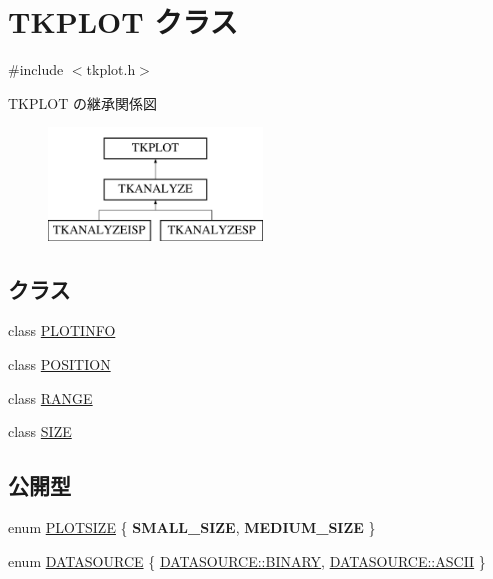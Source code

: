 \hypertarget{class_t_k_p_l_o_t}{}\section{T\+K\+P\+L\+OT クラス}
\label{class_t_k_p_l_o_t}


{\ttfamily \#include $<$tkplot.\+h$>$}

T\+K\+P\+L\+OT の継承関係図\begin{figure}[H]
\begin{center}
\leavevmode
\includegraphics[height=3.000000cm]{class_t_k_p_l_o_t}
\end{center}
\end{figure}
\subsection*{クラス}
\begin{DoxyCompactItemize}
\item 
class \hyperlink{class_t_k_p_l_o_t_1_1_p_l_o_t_i_n_f_o}{P\+L\+O\+T\+I\+N\+FO}
\item 
class \hyperlink{class_t_k_p_l_o_t_1_1_p_o_s_i_t_i_o_n}{P\+O\+S\+I\+T\+I\+ON}
\item 
class \hyperlink{class_t_k_p_l_o_t_1_1_r_a_n_g_e}{R\+A\+N\+GE}
\item 
class \hyperlink{class_t_k_p_l_o_t_1_1_s_i_z_e}{S\+I\+ZE}
\end{DoxyCompactItemize}
\subsection*{公開型}
\begin{DoxyCompactItemize}
\item 
enum \hyperlink{class_t_k_p_l_o_t_a158082ae168750554cf23edde9a27416}{P\+L\+O\+T\+S\+I\+ZE} \{ {\bfseries S\+M\+A\+L\+L\+\_\+\+S\+I\+ZE}, 
{\bfseries M\+E\+D\+I\+U\+M\+\_\+\+S\+I\+ZE}
 \}
\item 
enum \hyperlink{class_t_k_p_l_o_t_a28dfea1dd78dfc49c1926518da615bfa}{D\+A\+T\+A\+S\+O\+U\+R\+CE} \{ \hyperlink{class_t_k_p_l_o_t_a28dfea1dd78dfc49c1926518da615bfaa98ad0e8750ae10ad556ed7a62affb452}{D\+A\+T\+A\+S\+O\+U\+R\+C\+E\+::\+B\+I\+N\+A\+RY}, 
\hyperlink{class_t_k_p_l_o_t_a28dfea1dd78dfc49c1926518da615bfaad2cd8253361a9c732d21ca1d336599cc}{D\+A\+T\+A\+S\+O\+U\+R\+C\+E\+::\+A\+S\+C\+II}
 \}
\end{DoxyCompactItemize}
